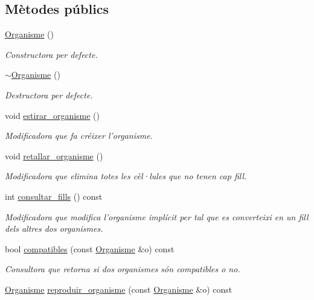 \subsection*{Mètodes públics}
\begin{DoxyCompactItemize}
\item 
\hyperlink{class_organisme_a5624eb8adf14bc96d783067d51605fbd}{Organisme} ()
\begin{DoxyCompactList}\small\item\em Constructora per defecte. \end{DoxyCompactList}\item 
\hyperlink{class_organisme_a55c9d7cbc9683970ad88455fdc3be7aa}{$\sim$\-Organisme} ()
\begin{DoxyCompactList}\small\item\em Destructora per defecte. \end{DoxyCompactList}\item 
void \hyperlink{class_organisme_a41a2ea17f4287dc3d00a45476a602309}{estirar\-\_\-organisme} ()
\begin{DoxyCompactList}\small\item\em Modificadora que fa créixer l'organisme. \end{DoxyCompactList}\item 
void \hyperlink{class_organisme_a3db36c1cb9d93f2750fd033b137dc702}{retallar\-\_\-organisme} ()
\begin{DoxyCompactList}\small\item\em Modificadora que elimina totes les cèl·lules que no tenen cap fill. \end{DoxyCompactList}\item 
int \hyperlink{class_organisme_a908bceb8c1aa3ec7e5eeb3c5c10f111b}{consultar\-\_\-fills} () const 
\begin{DoxyCompactList}\small\item\em Modificadora que modifica l'organisme implícit per tal que es converteixi en un fill dels altres dos organismes. \end{DoxyCompactList}\item 
bool \hyperlink{class_organisme_a4706d097ab7348c9161cc8f8a5052418}{compatibles} (const \hyperlink{class_organisme}{Organisme} \&o) const 
\begin{DoxyCompactList}\small\item\em Consultora que retorna si dos organismes són compatibles o no. \end{DoxyCompactList}\item 
\hyperlink{class_organisme}{Organisme} \hyperlink{class_organisme_a82d843de079550e169f5d479ec21619f}{reproduir\-\_\-organisme} (const \hyperlink{class_organisme}{Organisme} \&o) const 

\end{DoxyCompactItemize}
